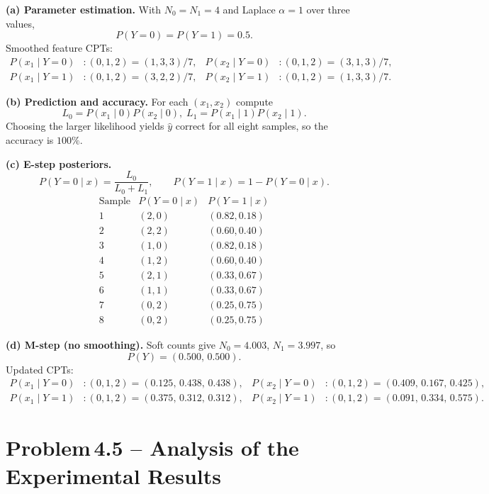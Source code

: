 \documentclass[11pt]{article}
\begin{document}
\noindent\textbf{(a) Parameter estimation.}
With $N_0=N_1=4$ and Laplace $\alpha=1$ over three values,
\[
P(Y=0)=P(Y=1)=0.5.
\]
Smoothed feature CPTs:
\[
\begin{aligned}
P(x_1\mid Y=0)&:(0,1,2)=(1,3,3)/7, &
P(x_2\mid Y=0)&:(0,1,2)=(3,1,3)/7,\\
P(x_1\mid Y=1)&:(0,1,2)=(3,2,2)/7, &
P(x_2\mid Y=1)&:(0,1,2)=(1,3,3)/7.
\end{aligned}
\]

\noindent\textbf{(b) Prediction and accuracy.}
For each $(x_1,x_2)$ compute
\[
L_0=P(x_1\!\mid0)P(x_2\!\mid0),\;
L_1=P(x_1\!\mid1)P(x_2\!\mid1).
\]
Choosing the larger likelihood yields $\hat y$ correct for all eight samples, so the accuracy is $100\%$.

\bigskip
\noindent\textbf{(c) E-step posteriors.}
\[
  P(Y=0\mid x)=\frac{L_0}{L_0+L_1},\qquad
  P(Y=1\mid x)=1-P(Y=0\mid x).
\]
\[
  \begin{array}{c|cc}
    \text{Sample}&P(Y=0\mid x)&P(Y=1\mid x)\\\hline
    1&(2,0)&(0.82,0.18)\\
    2&(2,2)&(0.60,0.40)\\
    3&(1,0)&(0.82,0.18)\\
    4&(1,2)&(0.60,0.40)\\
    5&(2,1)&(0.33,0.67)\\
    6&(1,1)&(0.33,0.67)\\
    7&(0,2)&(0.25,0.75)\\
    8&(0,2)&(0.25,0.75)
  \end{array}
\]

\noindent\textbf{(d) M-step (no smoothing).}
Soft counts give $N_0\!=\!4.003$, $N_1\!=\!3.997$, so
\[
P(Y)=(0.500,\,0.500).
\]
Updated CPTs:
\[
\begin{aligned}
  P(x_1\mid Y=0)&:(0,1,2)=(0.125,\,0.438,\,0.438),&
  P(x_2\mid Y=0)&:(0,1,2)=(0.409,\,0.167,\,0.425),\\
  P(x_1\mid Y=1)&:(0,1,2)=(0.375,\,0.312,\,0.312),&
  P(x_2\mid Y=1)&:(0,1,2)=(0.091,\,0.334,\,0.575).
\end{aligned}
\]


\section*{Problem\,4.5  \;--\;  Analysis of the Experimental Results}
\end{document}
